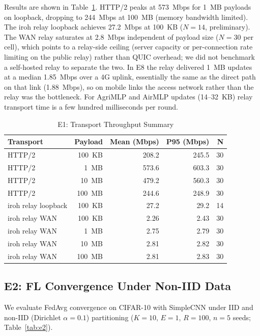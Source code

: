 Results are shown in Table~\ref{tab:e1}. HTTP/2 peaks at 573~Mbps for 1~MB payloads on loopback, dropping to 244~Mbps at 100~MB (memory bandwidth limited). The iroh relay loopback achieves 27.2~Mbps at 100~KB ($N{=}14$, preliminary). The WAN relay saturates at 2.8~Mbps independent of payload size ($N{=}30$ per cell), which points to a relay-side ceiling (server capacity or per-connection rate limiting on the public relay) rather than QUIC overhead; we did not benchmark a self-hosted relay to separate the two. In E8 the relay delivered 1~MB updates at a median 1.85~Mbps over a 4G uplink, essentially the same as the direct path on that link (1.88~Mbps), so on mobile links the access network rather than the relay was the bottleneck. For AgriMLP and AirMLP updates (14--32~KB) relay transport time is a few hundred milliseconds per round.

\begin{table}[t]
\centering
\caption{E1: Transport Throughput Summary}
\label{tab:e1}
\scriptsize
\setlength{\tabcolsep}{3.5pt}
\begin{tabular}{l r r r r}
\toprule
\textbf{Transport} & \textbf{Payload} & \textbf{Mean (Mbps)} & \textbf{P95 (Mbps)} & \textbf{N} \\
\midrule
HTTP/2               & 100~KB  & 208.2  & 245.5  & 30 \\
HTTP/2               & 1~MB    & 573.6  & 603.3  & 30 \\
HTTP/2               & 10~MB   & 479.2  & 560.3  & 30 \\
HTTP/2               & 100~MB  & 244.6  & 248.9  & 30 \\
\midrule
iroh relay loopback  & 100~KB  & 27.2   & 29.2   & 14 \\
\midrule
iroh relay WAN       & 100~KB  & 2.26   & 2.43   & 30 \\
iroh relay WAN       & 1~MB    & 2.75   & 2.79   & 30 \\
iroh relay WAN       & 10~MB   & 2.81   & 2.82   & 30 \\
iroh relay WAN       & 100~MB  & 2.81   & 2.83   & 30 \\
\bottomrule
\end{tabular}
\end{table}

\subsection{E2: FL Convergence Under Non-IID Data}
\label{sec:e2}

We evaluate FedAvg convergence on CIFAR-10 with SimpleCNN under IID and non-IID (Dirichlet $\alpha{=}0.1$) partitioning ($K{=}10$, $E{=}1$, $R{=}100$, $n{=}5$ seeds; Table~\ref{tab:e2}).


